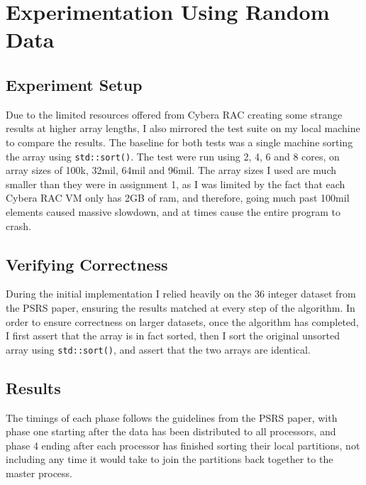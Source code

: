 \documentclass[11pt]{report}
\begin{document}
\section*{Experimentation Using Random Data}
\subsection*{Experiment Setup}
Due to the limited resources offered from Cybera RAC creating some strange results
at higher array lengths, I also mirrored the test suite on my local machine to
compare the results. The baseline for both tests was a single machine sorting the
array using \verb|std::sort()|. The test were run using 2, 4, 6 and 8 cores, on array sizes of 100k, 32mil, 64mil and 96mil. The array sizes I used are much smaller
than they were in assignment 1, as I was limited by the fact that each Cybera RAC
VM only has 2GB of ram, and therefore, going much past 100mil elements caused 
massive slowdown, and at times cause the entire program to crash.
\subsection*{Verifying Correctness}
During the initial implementation I relied heavily on the 36 integer dataset from the 
PSRS paper, ensuring the results matched at every step of the algorithm. In order to ensure correctness on larger datasets, once the algorithm has completed, I first assert that the array is in fact sorted, then I sort the original unsorted array using \verb|std::sort()|, and assert that the two arrays are identical.
\subsection*{Results}
The timings of each phase follows the guidelines from the PSRS paper, with phase one starting after the data has been distributed to all processors, and phase 4 ending
after each processor has finished sorting their local partitions, not including any time it would take to join the partitions back together to the master process.\\
\end{document}

